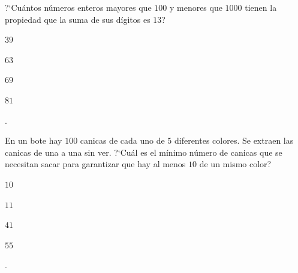 \begin{Solucion}
  
\end{Solucion}

\begin{Problema}{8}
  ?`Cu\'antos n\'umeros enteros mayores que $100$ y menores que
  $1000$ tienen la propiedad que la suma de sus d\'igitos es $13$?

  \begin{inparaenum}
  \item $39$ \esp
  \item $63$ \esp
  \item $69$ \esp
  \item $81$ \esp
  \item \nota.
  \end{inparaenum}
\end{Problema}

\begin{Solucion}
  
\end{Solucion}

\begin{Problema}{9}
  En un bote hay $100$ canicas de cada uno de $5$ diferentes
  colores. Se extraen las canicas de una a una sin ver. ?`Cu\'al es el
  m\'inimo n\'umero de canicas que se necesitan sacar para garantizar
  que hay al menos $10$ de un mismo color?

  \begin{inparaenum}
  \item $10$ \esp
  \item $11$ \esp
  \item $41$ \esp
  \item $55$ \esp
  \item \nota.
  \end{inparaenum}
\end{Problema}

\begin{Solucion}
  
\end{Solucion}

